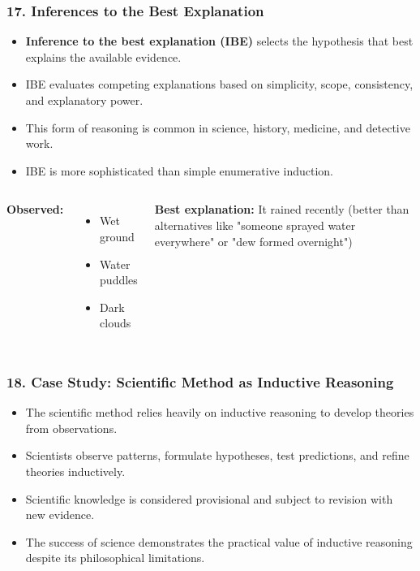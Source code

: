 \documentclass{beamer}
\begin{document}
\begin{frame}
\frametitle{17. Inferences to the Best Explanation}
\begin{itemize}
\item \textbf{Inference to the best explanation (IBE)} selects the hypothesis that best explains the available evidence.
\item IBE evaluates competing explanations based on simplicity, scope, consistency, and explanatory power.
\item This form of reasoning is common in science, history, medicine, and detective work.
\item IBE is more sophisticated than simple enumerative induction.
\end{itemize}

\begin{columns}
\textbf{Observed:}
\begin{itemize}
\item Wet ground
\item Water puddles
\item Dark clouds
\end{itemize}

\textbf{Best explanation:}
It rained recently (better than alternatives like "someone sprayed water everywhere" or "dew formed overnight")
\end{columns}
\end{frame}

\begin{frame}
\frametitle{18. Case Study: Scientific Method as Inductive Reasoning}
\begin{itemize}
\item The scientific method relies heavily on inductive reasoning to develop theories from observations.
\item Scientists observe patterns, formulate hypotheses, test predictions, and refine theories inductively.
\item Scientific knowledge is considered provisional and subject to revision with new evidence.
\item The success of science demonstrates the practical value of inductive reasoning despite its philosophical limitations.
\end{itemize}

\end{frame}
\end{document}
